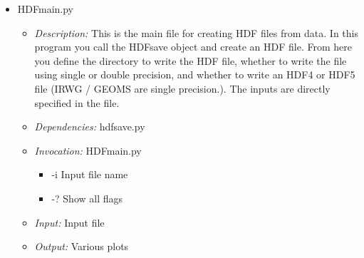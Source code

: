 \documentclass[12pt, letterpaper]{article}
\begin{document}
\begin{itemize}
\item HDFmain.py
\begin{itemize}
\item \textit{Description:} This is the main file for creating HDF files from data. In this program you call the HDFsave object and create an HDF file. From here you define the directory to write the HDF file, whether to write the file using single or double precision, and whether to write an HDF4 or HDF5 file (IRWG / GEOMS are single precision.). The inputs are directly specified in the file.
\item \textit{Dependencies:} hdfsave.py
\item \textit{Invocation:} HDFmain.py
\begin{itemize}
\item -i Input file name
\item -? Show all flags
\end{itemize}
\item \textit{Input:} Input file
\item \textit{Output:} Various plots
\end{itemize}
\end{itemize}
\end{document}
